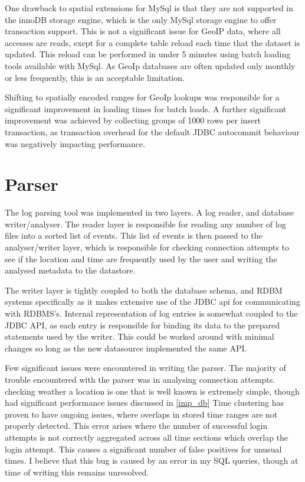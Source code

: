 One drawback to spatial extensions for MySql is that they are not supported in the innoDB storage engine, which is the only MySql storage engine to offer transaction support. This is not a significant issue for GeoIP data, where all accesses are reads, exept for a complete table reload each time that the dataset is updated. This reload can be performed in under 5 minutes using batch loading tools available with MySql. As GeoIp databases are often updated only monthly or less frequently, this is an acceptable limitation. 

Shifting to spatially encoded ranges for GeoIp lookups was responsible for a significant improvement in loading times for batch loads. A further significant improvement was achieved by collecting groups of 1000 rows per insert transaction, as transaction overhead for the default JDBC autocommit behaviour was negatively impacting performance. 
 
\section{Parser}

The log parsing tool was implemented in two layers. A log reader, and database writer/analyser. 
The reader layer is responsible for reading any number of log files into a sorted list of events.
This list of events is then passed to the analyser/writer layer, which is responsible for checking connection attempts to see if the location and time are frequently used by the user and writing the analysed metadata to the datastore.

The writer layer is tightly coupled to both the database schema, and RDBM systems specifically as it makes extensive use of the JDBC api for communicating with RDBMS's.
Internal representation of log entries is somewhat coupled to the JDBC API, as each entry is responsible for binding its data to the prepared statements used by the writer.
This could be worked around with minimal changes so long as the new datasource implemented the same API.

Few significant issues were encountered in writing the parser. 
The majority of trouble encountered with the parser was in analysing connection attempts. checking weather a location  is one that is well known is extremely simple, though had significant performance issues discussed in \ref{imp_db}
Time clustering has proven to have ongoing issues, where overlaps in stored time ranges are not properly detected. This error arises where the number of successful login attempts is not correctly aggregated across all time sections which overlap the login attempt. This causes a significant number of false positives for unusual times. I believe that this bug is caused by an error in my SQL queries, though at time of writing this remains unresolved. 

